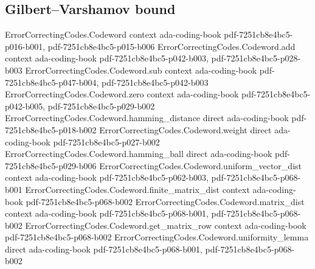 \subsection{Gilbert--Varshamov bound}

\begin{theorem}
\label{ErrorCorrectingCodes.Codeword.gv_bound}
\leanok
{}
\proofstep
  {ErrorCorrectingCodes.Codeword}
  {context}
  {ada-coding-book}
  {pdf-7251cb8e4bc5-p016-b001,
    pdf-7251cb8e4bc5-p015-b006}
\proofstep
  {ErrorCorrectingCodes.Codeword.add}
  {context}
  {ada-coding-book}
  {pdf-7251cb8e4bc5-p042-b003,
    pdf-7251cb8e4bc5-p028-b003}
\proofstep
  {ErrorCorrectingCodes.Codeword.sub}
  {context}
  {ada-coding-book}
  {pdf-7251cb8e4bc5-p047-b004,
    pdf-7251cb8e4bc5-p042-b003}
\proofstep
  {ErrorCorrectingCodes.Codeword.zero}
  {context}
  {ada-coding-book}
  {pdf-7251cb8e4bc5-p042-b005,
    pdf-7251cb8e4bc5-p029-b002}
\proofstep
  {ErrorCorrectingCodes.Codeword.hamming_distance}
  {direct}
  {ada-coding-book}
  {pdf-7251cb8e4bc5-p018-b002}
\proofstep
  {ErrorCorrectingCodes.Codeword.weight}
  {direct}
  {ada-coding-book}
  {pdf-7251cb8e4bc5-p027-b002}
\proofstep
  {ErrorCorrectingCodes.Codeword.hamming_ball}
  {direct}
  {ada-coding-book}
  {pdf-7251cb8e4bc5-p029-b006}
\proofstep
  {ErrorCorrectingCodes.Codeword.uniform_vector_dist}
  {context}
  {ada-coding-book}
  {pdf-7251cb8e4bc5-p062-b003,
    pdf-7251cb8e4bc5-p068-b001}
\proofstep
  {ErrorCorrectingCodes.Codeword.finite_matrix_dist}
  {context}
  {ada-coding-book}
  {pdf-7251cb8e4bc5-p068-b002}
\proofstep
  {ErrorCorrectingCodes.Codeword.matrix_dist}
  {context}
  {ada-coding-book}
  {pdf-7251cb8e4bc5-p068-b001,
    pdf-7251cb8e4bc5-p068-b002}
\proofstep
  {ErrorCorrectingCodes.Codeword.get_matrix_row}
  {context}
  {ada-coding-book}
  {pdf-7251cb8e4bc5-p068-b002}
\proofstep
  {ErrorCorrectingCodes.Codeword.uniformity_lemma}
  {direct}
  {ada-coding-book}
  {pdf-7251cb8e4bc5-p068-b001,
    pdf-7251cb8e4bc5-p068-b002}

\end{theorem}
